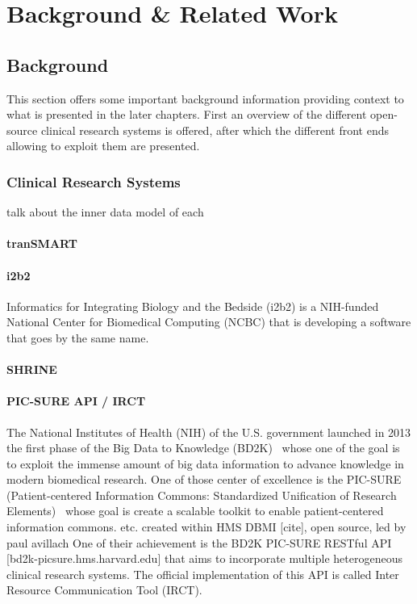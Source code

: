 \chapter{Background \& Related Work}

\section{Background}
This section offers some important background information providing context to what is presented in the later chapters. 
First an overview of the different open-source clinical research systems is offered, 
after which the different front ends allowing to exploit them are presented.

\subsection{Clinical Research Systems}

talk about the inner data model of each


\subsubsection{tranSMART}

\subsubsection{i2b2}
Informatics for Integrating Biology and the Bedside (i2b2) is a NIH-funded National Center for Biomedical Computing (NCBC) that is developing a software that goes by the same name. 




\subsubsection{SHRINE}

\subsubsection{PIC-SURE API / IRCT}

The National Institutes of Health (NIH) of the U.S. government launched in 2013 the first phase of the Big Data to Knowledge (BD2K)~\cite{BD2K} whose one of the goal is to exploit the immense amount of big data information to advance knowledge in modern biomedical research.
One of those center of excellence is the PIC-SURE (Patient-centered Information Commons: Standardized Unification of Research Elements)~\cite{PIC-SURE} whose goal is create a scalable toolkit to enable patient-centered information commons.
etc. created within HMS DBMI [cite], open source, 
led by paul avillach One of their achievement is the BD2K PIC-SURE RESTful API [bd2k-picsure.hms.harvard.edu] that aims to incorporate multiple heterogeneous clinical research systems. 
The official implementation of this API is called Inter Resource Communication Tool (IRCT).

